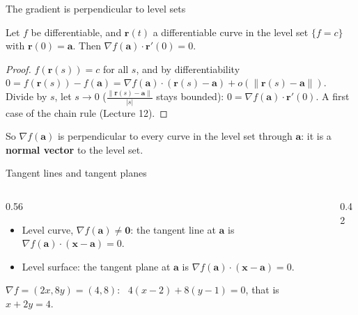 \documentclass[10pt]{wosm-slides}
\newcommand{\norm}[1]{\lVert #1 \rVert}
\newcommand{\vx}{\mathbf{x}}
\newcommand{\va}{\mathbf{a}}
\newcommand{\vr}{\mathbf{r}}
\begin{document}
\begin{frame}{The gradient is perpendicular to level sets}
  \begin{theorem}
    Let $f$ be differentiable, and $\vr(t)$ a differentiable curve in the level set
    $\{f = c\}$ with $\vr(0) = \va$. Then $\nabla f(\va) \cdot \vr'(0) = 0$.
  \end{theorem}
  \pause
  \begin{proof}
    $f(\vr(s)) = c$ for all $s$, and by differentiability
    $0 = f(\vr(s)) - f(\va) = \nabla f(\va) \cdot (\vr(s) - \va) + o(\norm{\vr(s) - \va})$.
    Divide by $s$, let $s \to 0$ ($\frac{\norm{\vr(s) - \va}}{|s|}$ stays bounded):
    $0 = \nabla f(\va) \cdot \vr'(0)$. A first case of the chain rule (Lecture 12).
  \end{proof}
  \pause
  So $\nabla f(\va)$ is perpendicular to every curve in the level set through $\va$: it is a
  \textbf{normal vector} to the level set.
\end{frame}

\begin{frame}{Tangent lines and tangent planes}
  \begin{columns}[c]
    \begin{column}{0.56\textwidth}
      \begin{itemize}
        \item Level curve, $\nabla f(\va) \ne \mathbf 0$: the tangent line at $\va$ is
          $\nabla f(\va) \cdot (\vx - \va) = 0$.
        \item Level surface: the tangent plane at $\va$ is
          $\nabla f(\va) \cdot (\vx - \va) = 0$.
      \end{itemize}
      \pause
      \begin{example}[Ellipse $x^2 + 4y^2 = 8$ at $(2, 1)$]
        $\nabla f = (2x, 8y) = (4, 8)$: \ $4(x - 2) + 8(y - 1) = 0$, that is $x + 2y = 4$.
      \end{example}
    \end{column}
    \begin{column}{0.42\textwidth}
      \centering
    \end{column}
  \end{columns}
\end{frame}
\end{document}
